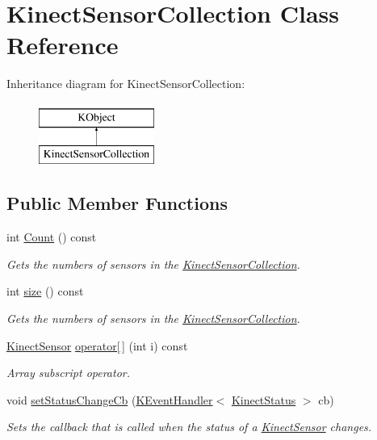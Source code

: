 \hypertarget{class_kinect_sensor_collection}{\section{\-Kinect\-Sensor\-Collection \-Class \-Reference}
\label{class_kinect_sensor_collection}
}
\-Inheritance diagram for \-Kinect\-Sensor\-Collection\-:\begin{figure}[H]
\begin{center}
\leavevmode
\includegraphics[height=2.000000cm]{class_kinect_sensor_collection}
\end{center}
\end{figure}
\subsection*{\-Public \-Member \-Functions}
\begin{DoxyCompactItemize}
\item 
int \hyperlink{class_kinect_sensor_collection_a63b366b1e45339c289656373a73424b2}{\-Count} () const 
\begin{DoxyCompactList}\small\item\em \-Gets the numbers of sensors in the \hyperlink{class_kinect_sensor_collection}{\-Kinect\-Sensor\-Collection}. \end{DoxyCompactList}\item 
int \hyperlink{class_kinect_sensor_collection_a44ce2747247e1eaa12e2b49cb5e05e42}{size} () const 
\begin{DoxyCompactList}\small\item\em \-Gets the numbers of sensors in the \hyperlink{class_kinect_sensor_collection}{\-Kinect\-Sensor\-Collection}. \end{DoxyCompactList}\item 
\hyperlink{class_kinect_sensor}{\-Kinect\-Sensor} \hyperlink{class_kinect_sensor_collection_a54dbf9e02d92758e69c8decfb4d46de4}{operator\mbox{[}$\,$\mbox{]}} (int i) const 
\begin{DoxyCompactList}\small\item\em \-Array subscript operator. \end{DoxyCompactList}\item 
void \hyperlink{class_kinect_sensor_collection_a13d3f7d3a75174708b767fd2fbd1c98d}{set\-Status\-Change\-Cb} (\hyperlink{class_k_event_handler}{\-K\-Event\-Handler}$<$ \hyperlink{kinect_status_8h_a485fe7473bcf235f8c51dda0754afd9f}{\-Kinect\-Status} $>$ cb)
\begin{DoxyCompactList}\small\item\em \-Sets the callback that is called when the status of a \hyperlink{class_kinect_sensor}{\-Kinect\-Sensor} changes. \end{DoxyCompactList}\end{DoxyCompactItemize}
